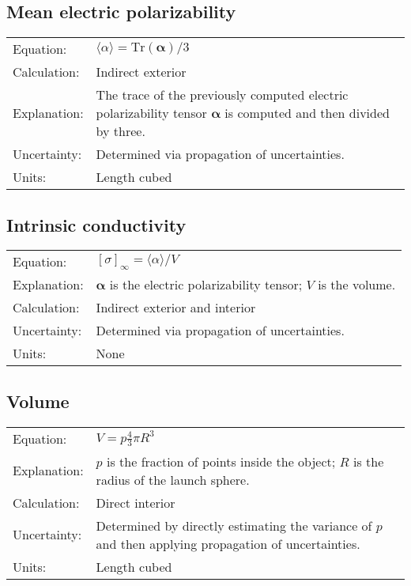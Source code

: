 \documentclass[12pt,letterpaper]{article}
\begin{document}
\subsection{Mean electric polarizability}
\begin{tabular}{p{1in} p{5.5in}}
Equation: & $\langle \alpha \rangle = \mathrm{Tr}(\mathbf{\alpha})/3$ \\
Calculation: & Indirect exterior  \\
Explanation: & The trace of the previously computed electric polarizability tensor $\mathbf{\alpha}$ is computed and then divided by three. \\
Uncertainty: & Determined via propagation of uncertainties. \\
Units: & Length cubed \\
\end{tabular}

\subsection{Intrinsic conductivity}
\begin{tabular}{p{1in} p{5.5in}}
Equation: & $[\sigma]_\infty = \langle \alpha \rangle/V$ \\
Explanation: & $\mathbf{\alpha}$ is the electric polarizability tensor; $V$ is the volume. \\
Calculation: & Indirect exterior and interior\\
Uncertainty: & Determined via propagation of uncertainties. \\
Units: & None \\
\end{tabular}

\subsection{Volume}
\begin{tabular}{p{1in} p{5.5in}}
Equation: & $V= p \frac{4}{3} \pi R^{3}$ \\
Explanation: & $p$ is the fraction of points inside the object; $R$ is the radius of the launch sphere. \\
Calculation: & Direct interior  \\
Uncertainty: & Determined by directly estimating the variance of $p$ and then applying propagation of uncertainties. \\
Units: & Length cubed \\
\end{tabular}
\end{document}
